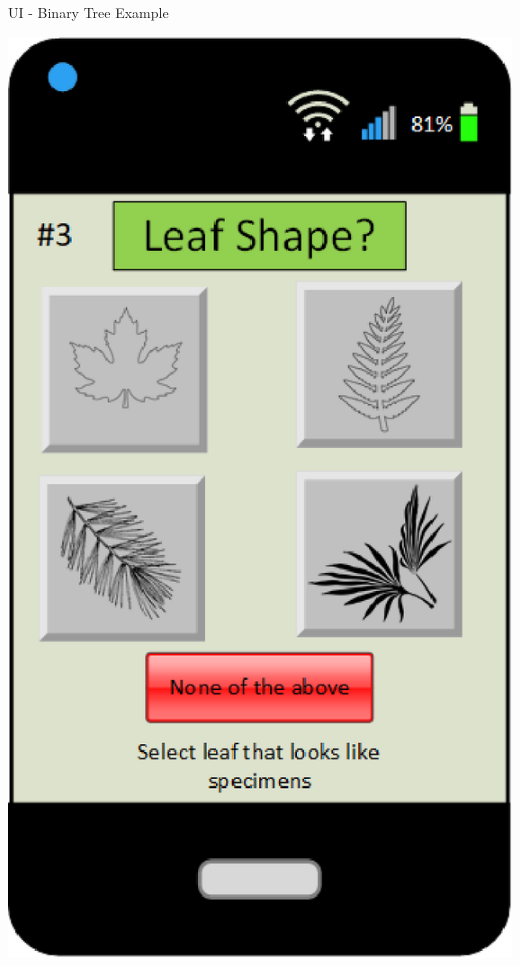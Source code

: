 \documentclass{beamer}
\begin{document}
\begin{frame}{UI - Binary Tree Example}
\begin{center}\includegraphics[scale=.5]{20Questions.eps}\end{center}
\end{frame}
\end{document}
